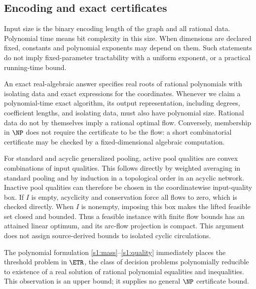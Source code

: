 \subsection{Encoding and exact certificates}\label{s1:encoding}

Input size is the binary encoding length of the graph and all rational
data. Polynomial time means bit complexity in this size. When dimensions
are declared fixed, constants and polynomial exponents may depend on
them. Such statements do not imply fixed-parameter tractability with a
uniform exponent, or a practical running-time bound.

An exact real-algebraic answer specifies real roots of rational
polynomials with isolating data and exact expressions for the coordinates.
Whenever we claim a polynomial-time exact algorithm, its output
representation, including degrees, coefficient lengths, and isolating
data, must also have polynomial size. Rational data do not by themselves
imply a rational optimal flow. Conversely, membership in $\NP$ does not
require the certificate to be the flow: a short combinatorial certificate
may be checked by a fixed-dimensional algebraic computation.

For standard and acyclic generalized pooling, active pool qualities are
convex combinations of input qualities. This follows directly by
weighted averaging in standard pooling and by induction in a topological
order in an acyclic network. Inactive pool qualities can therefore be
chosen in the coordinatewise input-quality box. If $I$ is empty, acyclicity
and conservation force all flows to zero, which is checked directly.
When $I$ is nonempty, imposing this box makes the lifted feasible set
closed and bounded. Thus a feasible instance with finite flow bounds
has an attained linear optimum, and its arc-flow projection is compact.
This argument does not assign source-derived bounds to isolated cyclic
circulations.

The polynomial formulation \eqref{s1:mass}--\eqref{s1:quality} immediately
places the threshold problem in $\ETR$, the class of decision problems
polynomially reducible to existence of a real solution of rational
polynomial equalities and inequalities. This observation is an upper
bound; it supplies no general $\NP$ certificate bound.

